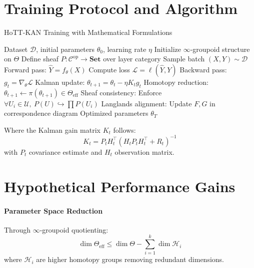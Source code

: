 \documentclass{article}
\begin{document}
\section{Training Protocol and Algorithm}
\label{sec:training_protocol}

\begin{algorithm}[t]
\caption{HoTT-KAN Training with Mathematical Formulations}
\label{alg:hott_kan}
\begin{algorithmic}[1]
\REQUIRE Dataset $\mathcal{D}$, initial parameters $\theta_0$, learning rate $\eta$
\STATE Initialize $\infty$-groupoid structure on $\Theta$
\STATE Define sheaf $P: \mathcal{C}^{\text{op}} \to \mathbf{Set}$ over layer category
    \STATE Sample batch $(X,Y) \sim \mathcal{D}$
    \STATE Forward pass: $\hat{Y} = f_\theta(X)$
    \STATE Compute loss $\mathcal{L} = \ell(\hat{Y}, Y)$
    \STATE Backward pass: $g_t = \nabla_\theta \mathcal{L}$
    \STATE Kalman update: $\theta_{t+1} = \theta_t - \eta K_t g_t$
    \STATE Homotopy reduction: $\theta_{t+1} \leftarrow \pi(\theta_{t+1}) \in \Theta_{\text{eff}}$
    \STATE Sheaf consistency: Enforce $\forall U_i \in \mathcal{U},\ P(U) \hookrightarrow \prod P(U_i)$
    \STATE Langlands alignment: Update $F,G$ in correspondence diagram
\ENDFOR
\RETURN Optimized parameters $\theta_T$
\end{algorithmic}
\end{algorithm}

Where the Kalman gain matrix $K_t$ follows:
\begin{equation}
    K_t = P_t H_t^\top (H_t P_t H_t^\top + R_t)^{-1}
\end{equation}
with $P_t$ covariance estimate and $H_t$ observation matrix.

\section{Hypothetical Performance Gains}
\label{sec:performance_gains}

\paragraph{Parameter Space Reduction} Through $\infty$-groupoid quotienting:
\begin{equation}
    \dim \Theta_{\text{eff}} \leq \dim \Theta - \sum_{i=1}^k \dim \mathcal{H}_i
\end{equation}
where $\mathcal{H}_i$ are higher homotopy groups removing redundant dimensions.
\end{document}
